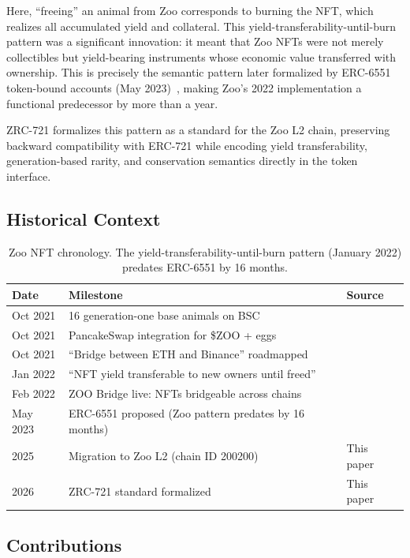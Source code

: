 \documentclass[11pt,letterpaper]{article}
\begin{document}
Here, ``freeing'' an animal from Zoo corresponds to burning the NFT, which realizes all accumulated yield and collateral. This yield-transferability-until-burn pattern was a significant innovation: it meant that Zoo NFTs were not merely collectibles but yield-bearing instruments whose economic value transferred with ownership. This is precisely the semantic pattern later formalized by ERC-6551 token-bound accounts (May 2023)~\cite{erc-6551}, making Zoo's 2022 implementation a functional predecessor by more than a year.

ZRC-721 formalizes this pattern as a standard for the Zoo L2 chain, preserving backward compatibility with ERC-721 while encoding yield transferability, generation-based rarity, and conservation semantics directly in the token interface.

\subsection{Historical Context}

\begin{table}[t]
\centering
\begin{tabular}{lll}
\toprule
\textbf{Date} & \textbf{Milestone} & \textbf{Source} \\
\midrule
Oct 2021 & 16 generation-one base animals on BSC & \cite{zoo-oct-2021-deck} \\
Oct 2021 & PancakeSwap integration for \$ZOO + eggs & \cite{zoo-oct-2021-deck} \\
Oct 2021 & ``Bridge between ETH and Binance'' roadmapped & \cite{zoo-oct-2021-deck} \\
Jan 2022 & ``NFT yield transferable to new owners until freed'' & \cite{zoo-jan-2022-deck} \\
Feb 2022 & ZOO Bridge live: NFTs bridgeable across chains & \cite{zoo-jan-2022-deck} \\
May 2023 & ERC-6551 proposed (Zoo pattern predates by 16 months) & \cite{erc-6551} \\
2025 & Migration to Zoo L2 (chain ID 200200) & This paper \\
2026 & ZRC-721 standard formalized & This paper \\
\bottomrule
\end{tabular}
\caption{Zoo NFT chronology. The yield-transferability-until-burn pattern (January 2022) predates ERC-6551 by 16 months.}
\label{tab:chronology}
\end{table}

\subsection{Contributions}
\end{document}
